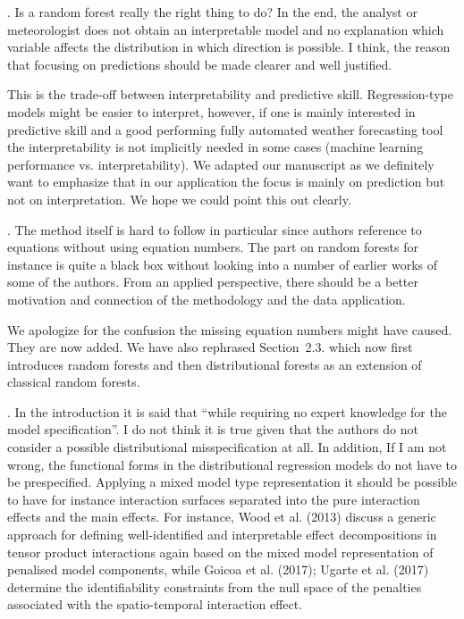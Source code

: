\documentclass[american,foldmarks=false,noconfig]{uibklttr}
\newenvironment{review}{\fontshape{\itdefault}\fontseries{\bfdefault} \selectfont \smallskip}{\par}
\begin{document}
\begin{review}
3. Is a random forest really the right thing to do? In the 
end, the analyst or meteorologist does not obtain an 
interpretable model and no explanation which variable 
affects the distribution in which direction is possible. 
I think, the reason that focusing on predictions should 
be made clearer and well justified.
\end{review}

This is the trade-off between interpretability and predictive 
skill. Regression-type models might be easier to interpret, 
however, if one is mainly interested in predictive skill and
a good performing fully automated weather forecasting tool the 
interpretability is not implicitly needed in some cases 
(machine learning performance vs. interpretability).
We adapted our manuscript as we definitely want to emphasize that 
in our application the focus is mainly on prediction but not on 
interpretation. We hope we could point this out clearly.

\begin{review}
4. The method itself is hard to follow in particular since 
authors reference to equations without using equation numbers. 
The part on random forests for instance is quite a black box 
without looking into a number of earlier works of some of 
the authors. From an applied perspective, there should be a 
better motivation and connection of the methodology and the 
data application.
\end{review}

We apologize for the confusion the missing equation numbers 
might have caused. They are now added.
We have also rephrased Section~2.3. which now first introduces random 
forests and then distributional forests as an extension of classical 
random forests.


\begin{review}
5. In the introduction it is said that ``while requiring no 
expert knowledge for the model specification''. I do not think 
it is true given that the authors do not consider a possible 
distributional misspecification at all. In addition, If I am 
not wrong, the functional forms in the distributional 
regression models do not have to be prespecified. Applying a 
mixed model type representation it should be possible to
have for instance interaction surfaces separated into the pure 
interaction effects and the main effects. For instance, 
Wood et al. (2013) discuss a generic approach for defining 
well-identified and interpretable effect decompositions in 
tensor product interactions again based on the mixed model 
representation of penalised model components, while Goicoa 
et al. (2017); Ugarte et al. (2017) determine the identifiability
constraints from the null space of the penalties associated 
with the spatio-temporal interaction effect.
\end{review}
\end{document}
